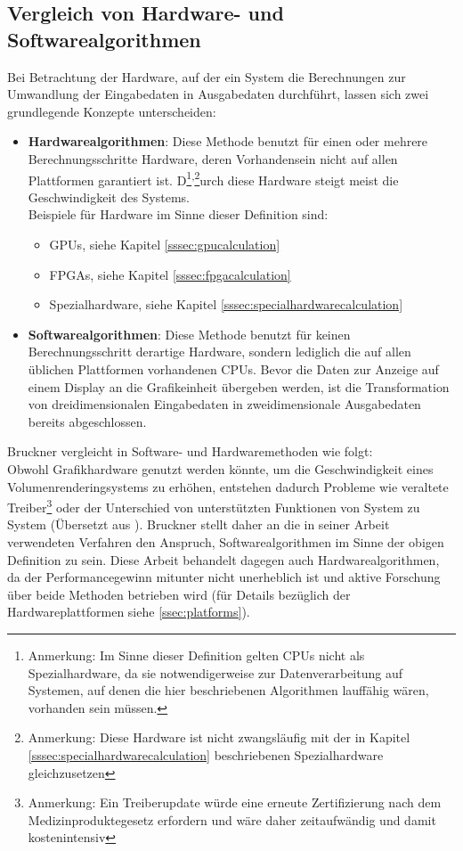 \documentclass[ngerman,pdftex,paper=A4,DIV=calc,titlepage,12pt]{scrartcl}
\newtheorem[L]{boxedDefinition}{Definition}
\begin{document}
\subsection{Vergleich von Hardware- und Softwarealgorithmen}\label{ssec:swhwcomparison}
Bei Betrachtung der Hardware, auf der ein System die Berechnungen zur Umwandlung der Eingabedaten in Ausgabedaten durchführt, lassen sich zwei grundlegende Konzepte unterscheiden:
\begin{itemize}
 \item \textbf{Hardwarealgorithmen}: Diese Methode benutzt für einen oder mehrere Berechnungsschritte Hardware, deren Vorhandensein nicht auf allen Plattformen garantiert ist. D\footnote{Anmerkung: Im Sinne dieser Definition gelten CPUs nicht als Spezialhardware, da sie notwendigerweise zur Datenverarbeitung auf Systemen, auf denen die hier beschriebenen Algorithmen lauffähig  wären, vorhanden sein müssen.}\textsuperscript{,}\footnote{Anmerkung: Diese Hardware ist nicht zwangsläufig mit der in Kapitel \ref{sssec:specialhardwarecalculation} beschriebenen Spezialhardware gleichzusetzen}urch diese Hardware steigt meist die Geschwindigkeit des Systems.\\
 Beispiele für Hardware im Sinne dieser Definition sind:
 \begin{itemize}
  \item GPUs, siehe Kapitel \vref{sssec:gpucalculation} 
  \item FPGAs, siehe Kapitel \vref{sssec:fpgacalculation}
  \item Spezialhardware, siehe Kapitel \vref{sssec:specialhardwarecalculation}
 \end{itemize}
 \item \textbf{Softwarealgorithmen}: Diese Methode benutzt für keinen Berechnungsschritt derartige Hardware, sondern lediglich die auf allen üblichen Plattformen vorhandenen CPUs. Bevor die Daten zur Anzeige auf einem Display an die Grafikeinheit übergeben werden, ist die Transformation von dreidimensionalen Eingabedaten in zweidimensionale Ausgabedaten bereits abgeschlossen.
\end{itemize}

Bruckner vergleicht in \cite{Bruckner2004} Software- und Hardwaremethoden wie folgt:\\
Obwohl Grafikhardware genutzt werden könnte, um die Geschwindigkeit eines Volumenrenderingsystems zu erhöhen, entstehen dadurch Probleme wie veraltete Treiber\footnote{Anmerkung: Ein Treiberupdate würde eine erneute Zertifizierung nach dem Medizinproduktegesetz erfordern und wäre daher zeitaufwändig und damit kostenintensiv} oder der Unterschied von unterstützten Funktionen von System zu System (Übersetzt aus \cite[Kapitel 3.1.1, Seite 17, Paragraph \glqq Pure Software \grqq]{Bruckner2004}).
Bruckner stellt daher an die in seiner Arbeit verwendeten Verfahren den Anspruch, Softwarealgorithmen im Sinne der obigen Definition zu sein.
Diese Arbeit behandelt dagegen auch Hardwarealgorithmen, da der Performancegewinn mitunter nicht unerheblich ist und aktive Forschung über beide Methoden betrieben wird (für Details bezüglich der Hardwareplattformen siehe \vref{ssec:platforms}).
\end{document}
